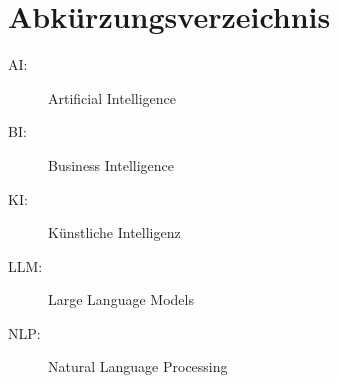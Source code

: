

\section *{Abkürzungsverzeichnis} %
\begin{description}
    \item[AI:] Artificial Intelligence
    \item[BI:] Business Intelligence
    \item[KI:] Künstliche Intelligenz
    \item[LLM:] Large Language Models
    \item[NLP:] Natural Language Processing
\end{description}

